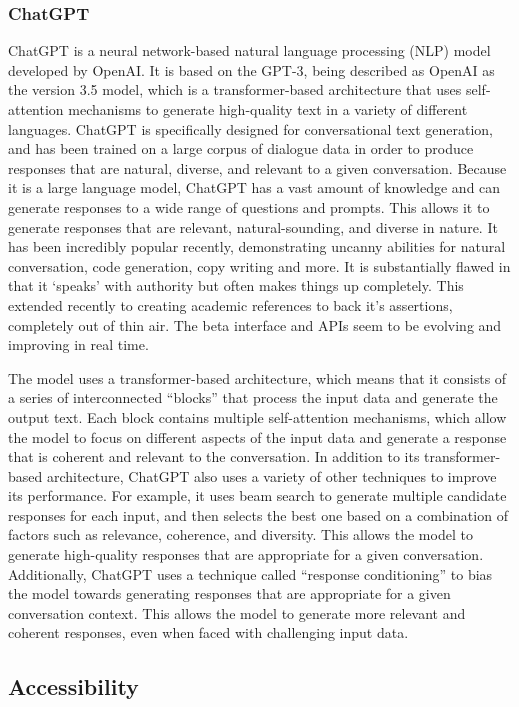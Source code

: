 \subsubsection{ChatGPT}
ChatGPT is a neural network-based natural language processing (NLP) model developed by OpenAI. It is based on the GPT-3, being described as OpenAI as the version 3.5 model, which is a transformer-based architecture that uses self-attention mechanisms to generate high-quality text in a variety of different languages. ChatGPT is specifically designed for conversational text generation, and has been trained on a large corpus of dialogue data in order to produce responses that are natural, diverse, and relevant to a given conversation. Because it is a large language model, ChatGPT has a vast amount of knowledge and can generate responses to a wide range of questions and prompts. This allows it to generate responses that are relevant, natural-sounding, and diverse in nature. It has been incredibly popular recently, demonstrating uncanny abilities for natural conversation, code generation, copy writing and more. It is substantially flawed in that it `speaks' with authority but often makes things up completely. This extended recently to creating academic references to back it's assertions, completely out of thin air. The beta interface and APIs seem to be evolving and improving in real time.\par
The model uses a transformer-based architecture, which means that it consists of a series of interconnected ``blocks'' that process the input data and generate the output text. Each block contains multiple self-attention mechanisms, which allow the model to focus on different aspects of the input data and generate a response that is coherent and relevant to the conversation. In addition to its transformer-based architecture, ChatGPT also uses a variety of other techniques to improve its performance. For example, it uses beam search to generate multiple candidate responses for each input, and then selects the best one based on a combination of factors such as relevance, coherence, and diversity. This allows the model to generate high-quality responses that are appropriate for a given conversation. Additionally, ChatGPT uses a technique called ``response conditioning'' to bias the model towards generating responses that are appropriate for a given conversation context. This allows the model to generate more relevant and coherent responses, even when faced with challenging input data.

\subsection{Accessibility}
